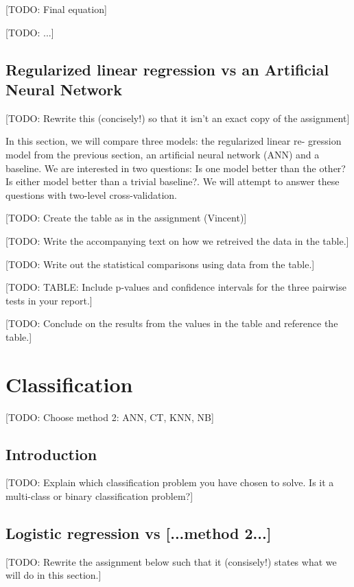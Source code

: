 \documentclass[dtu]{dtuarticle}
\newcommand{\todo}[1]{\color{red}[TODO: #1]\color{black}}
\begin{document}
	\todo{Final equation}

	\todo{...}

	\subsection{Regularized linear regression vs an Artificial Neural Network}

	\todo{Rewrite this (concisely!) so that it isn't an exact copy of the assignment}

	In this section, we will compare three models: the regularized linear re-
	gression model from the previous section, an artificial neural network (ANN) and a baseline. We
	are interested in two questions: Is one model better than the other? Is either model better than
	a trivial baseline?. We will attempt to answer these questions with two-level cross-validation.

	\todo{Create the table as in the assignment (Vincent)}

	\todo{Write the accompanying text on how we retreived the data in the table.}

	\todo{Write out the statistical comparisons using data from the table.}

	\todo{TABLE: Include p-values and confidence intervals for the three pairwise tests in your report.}

	\todo{Conclude on the results from the values in the table and reference the table.}


	\section{Classification}

	\todo{Choose method 2: ANN, CT, KNN, NB}

	\subsection{Introduction}

	\todo{Explain which classification problem you have chosen to solve. Is it a multi-class or binary
		classification problem?}

	\subsection{Logistic regression vs [...method 2...]}

	\todo{Rewrite the assignment below such that it (consisely!) states what we will do in this section.}
\end{document}
